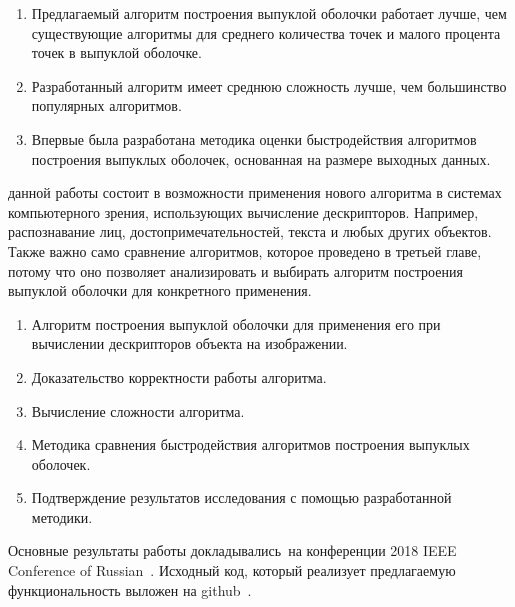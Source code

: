 {\novelty}
\begin{enumerate}
	\item Предлагаемый алгоритм построения выпуклой оболочки работает лучше, чем существующие алгоритмы для среднего количества точек и малого процента точек в выпуклой оболочке.
	\item Разработанный алгоритм имеет среднюю сложность лучше, чем большинство популярных алгоритмов.
	\item Впервые была разработана методика оценки быстродействия алгоритмов построения выпуклых оболочек, основанная на размере выходных данных.
\end{enumerate}

{\influence} данной работы состоит в возможности применения нового алгоритма в системах компьютерного зрения, использующих вычисление дескрипторов. Например, распознавание лиц, достопримечательностей, текста и любых других объектов. Также важно само сравнение алгоритмов, которое проведено в третьей главе, потому что оно позволяет анализировать и выбирать алгоритм построения выпуклой оболочки для конкретного применения.

{}
\begin{enumerate}
 	\item Алгоритм построения выпуклой оболочки для применения его при вычислении дескрипторов объекта на изображении.
	\item Доказательство корректности работы алгоритма.
	\item Вычисление сложности алгоритма.
	\item Методика сравнения быстродействия алгоритмов построения выпуклых оболочек.
	\item Подтверждение результатов исследования с помощью разработанной методики.
\end{enumerate}

{\probation}
Основные результаты работы докладывались~на конференции 2018 IEEE Conference of Russian~\cite{matrokhin2018convex}. Исходный код, который реализует предлагаемую функциональность выложен на github~\cite{matrokhin2017github}.
